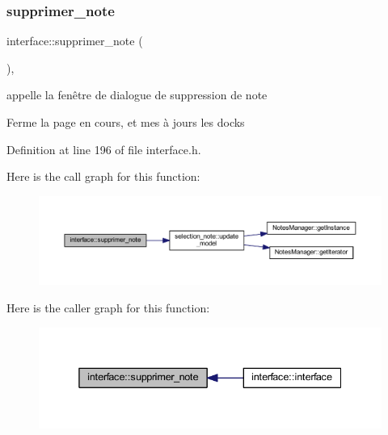 \subsubsection{\texorpdfstring{supprimer\+\_\+note}{supprimer\_note}}
{\footnotesize\ttfamily interface\+::supprimer\+\_\+note (\begin{DoxyParamCaption}{ }\end{DoxyParamCaption})\hspace{0.3cm}{\ttfamily [inline]}, {\ttfamily [slot]}}



appelle la fenêtre de dialogue de suppression de note 

Ferme la page en cours, et mes à jours les docks 

Definition at line 196 of file interface.\+h.

Here is the call graph for this function\+:\nopagebreak
\begin{figure}[H]
\begin{center}
\leavevmode
\includegraphics[width=350pt]{classinterface_aca23c755ba40ca8198010ff0487b22a8_cgraph}
\end{center}
\end{figure}
Here is the caller graph for this function\+:\nopagebreak
\begin{figure}[H]
\begin{center}
\leavevmode
\includegraphics[width=338pt]{classinterface_aca23c755ba40ca8198010ff0487b22a8_icgraph}
\end{center}
\end{figure}
\mbox{\label{classinterface_a430ee153cb2ea74b9103081d48cd61f3}} 
